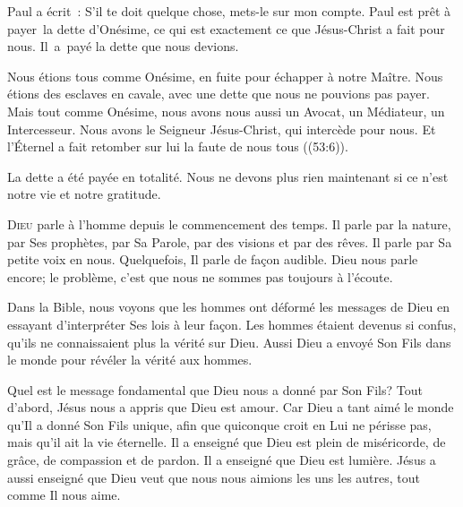 
Paul a écrit~: 
 \Og S'il 
 te doit quelque chose, mets-le sur mon compte. \Fg{}
 Paul est prêt à payer~la dette d'Onésime,
 ce qui est 
 exactement ce que Jésus-Christ a fait pour nous.
 Il~a~payé la dette que nous devions. 

Nous étions tous comme Onésime, en fuite pour échapper à notre Maître.
 Nous étions des esclaves en cavale, avec une dette que nous ne pouvions
 pas payer.
 Mais tout comme Onésime, nous avons nous aussi un Avocat, un Médiateur,
 un Intercesseur. Nous avons le Seigneur Jésus-Christ,
 qui intercède pour nous.
 \Og Et l'Éternel a fait retomber sur lui la faute de nous tous \Fg{}
 ((53:6)). 

La dette a été payée en totalité.
 Nous ne devons plus rien maintenant
 \ocadr si ce n'est notre vie et notre gratitude.

\dvrule






\lettrine{D}{ieu} parle à l'homme depuis le commencement des temps.
 Il parle par la nature, par Ses prophètes, par Sa Parole, par des visions
 et par des rêves.
 Il parle par Sa petite voix en nous. Quelquefois, Il parle de fa\c{c}on audible.
 Dieu nous parle encore; le problème, c'est que nous ne sommes pas toujours
 à l'écoute. 

Dans la Bible, nous voyons que les hommes ont déformé les messages de Dieu
 en essayant d'interpréter Ses lois à leur fa\c{c}on.
 Les hommes étaient devenus si confus, qu'ils ne connaissaient plus
 la vérité sur Dieu.
 Aussi Dieu a envoyé Son Fils dans le monde
 pour révéler la vérité aux hommes. 


Quel est le message fondamental que Dieu nous a donné par Son Fils?
 Tout d'abord, Jésus nous a appris que Dieu est amour.
 \Og Car Dieu a tant aimé le monde qu'Il a donné Son Fils unique,
 afin que quiconque croit en Lui ne périsse pas, mais qu'il ait
 la vie éternelle. \Fg{}
 Il a enseigné que Dieu est plein de miséricorde, de grâce,
 de compassion et de pardon. Il a enseigné que Dieu est lumière.
 Jésus a aussi enseigné que Dieu veut que nous nous aimions
 les uns les autres, tout comme Il nous aime. 

